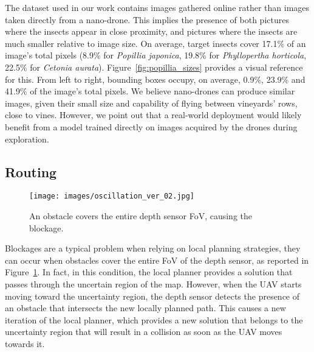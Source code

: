 The dataset used in our work contains images gathered online rather than images taken directly from a nano-drone. 
This implies the presence of both pictures where the insects appear in close proximity, and pictures where the insects are much smaller relative to image size. 
On average, target insects cover 17.1\% of an image’s total pixels (8.9\% for \textit{Popillia japonica}, 19.8\% for \textit{Phyllopertha horticola}, 22.5\% for \textit{Cetonia aurata}). 
Figure~\ref{fig:popillia_sizes} provides a visual reference for this. From left to right, bounding boxes occupy, on average, 0.9\%, 23.9\% and 41.9\% of the image's total pixels.
We believe nano-drones can produce similar images, given their small size and capability of flying between vineyards' rows, close to vines. 
However, we point out that a real-world deployment would likely benefit from a model trained directly on images acquired by the drones during exploration.


\subsection{Routing}

\begin{figure}[tb!]
\centering
\texttt{[image: images/oscillation\_ver\_02.jpg]}
\caption{An obstacle covers the entire depth sensor FoV, causing the blockage.}
\label{fig:deadlock}
\end{figure}


Blockages are a typical problem when relying on local planning strategies, they can occur when obstacles cover the entire FoV of the depth sensor, as reported in Figure~\ref{fig:deadlock}.
In fact, in this condition, the local planner provides a solution that passes through the uncertain region of the map.
However, when the UAV starts moving toward the uncertainty region, the depth sensor detects the presence of an obstacle that intersects the new locally planned path.
This causes a new iteration of the local planner, which provides a new solution that belongs to the uncertainty region that will result in a collision as soon as the UAV moves towards it.

